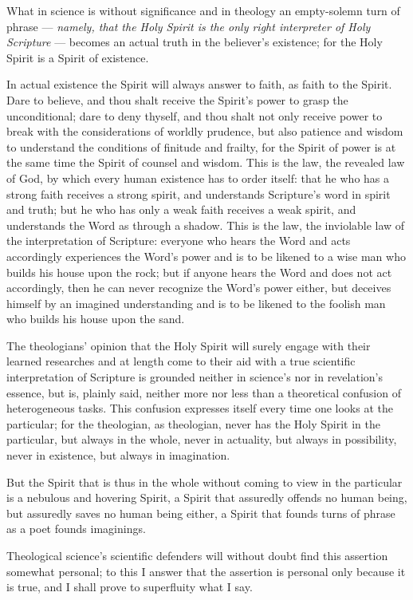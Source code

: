 \documentclass[12pt,a4paper]{book}
\begin{document}
What in science is without significance and in theology an empty-solemn turn of phrase
--- \emph{namely, that the Holy Spirit is the only right interpreter of Holy Scripture}
--- becomes an actual truth in the believer's existence; for the Holy Spirit is a Spirit
of existence.

In actual existence the Spirit will always answer to faith, as faith to the Spirit. Dare
to believe, and thou shalt receive the Spirit's power to grasp the unconditional; dare to
deny thyself, and thou shalt not only receive power to break with the considerations of
worldly prudence, but also patience and wisdom to understand the conditions of finitude
and frailty, for the Spirit of power is at the same time the Spirit of counsel and wisdom.
This is the law, the revealed law of God, by which every human existence has to order
itself: that he who has a strong faith receives a strong spirit, and understands
Scripture's word in spirit and truth; but he who has only a weak faith receives a weak
spirit, and understands the Word as through a shadow. This is the law, the inviolable law
of the interpretation of Scripture: everyone who hears the Word and acts accordingly
experiences the Word's power and is to be likened to a wise man who builds his house upon
the rock; but if anyone hears the Word and does not act accordingly, then he can never
recognize the Word's
power either, but deceives himself by an imagined understanding and is to be likened to
the foolish man who builds his house upon the sand.

The theologians' opinion that the Holy Spirit will surely engage with their learned
researches and at length come to their aid with a true scientific interpretation of
Scripture is grounded neither in science's nor in revelation's essence, but is, plainly
said, neither more nor less than a theoretical confusion of heterogeneous tasks. This
confusion expresses itself every time one looks at the particular; for the theologian, as
theologian, never has the Holy Spirit in the particular, but always in the whole, never in
actuality, but always in possibility, never in existence, but always in imagination.

But the Spirit that is thus in the whole without coming to view in the particular is a
nebulous and hovering Spirit, a Spirit that assuredly offends no human being, but
assuredly saves no human being either, a Spirit that founds turns of phrase as a poet
founds imaginings.

Theological science's scientific defenders will without doubt find this assertion somewhat
personal; to this I answer that the assertion is personal only because it is true, and I
shall prove to superfluity what I say.
\end{document}
